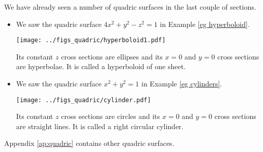 We have already seen a number of quadric surfaces in the last couple of 
sections.
\begin{itemize}
\item
We saw the quadric surface $4x^2+y^2-z^2=1$ in Example \ref{eg hyperboloid}. 
\begin{efig}
\begin{center}
   \texttt{[image: ../figs\_quadric/hyperboloid1.pdf]}\qquad
\end{center}
\end{efig}
Its constant $z$ cross sections are ellipses and its $x=0$ and $y=0$
cross sections are hyperbolae. It is called a hyperboloid of one sheet.


\item 
We saw the quadric surface $x^2+y^2=1$ in Example \ref{eg cylinders}.
\begin{efig}
\begin{center}
   \texttt{[image: ../figs\_quadric/cylinder.pdf]}\qquad
\end{center}
\end{efig}
Its constant $z$ cross sections are circles and its $x=0$ and $y=0$
cross sections are straight lines. It is called a right circular cylinder.



\end{itemize}

Appendix \ref{ap:quadric} contains other quadric surfaces.




